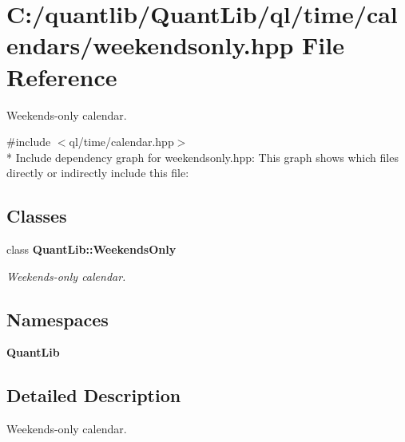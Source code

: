 \section{C\+:/quantlib/\+Quant\+Lib/ql/time/calendars/weekendsonly.hpp File Reference}
\label{weekendsonly_8hpp}


Weekends-\/only calendar.  


{\ttfamily \#include $<$ql/time/calendar.\+hpp$>$}\\*
Include dependency graph for weekendsonly.\+hpp\+:
This graph shows which files directly or indirectly include this file\+:
\subsection*{Classes}
\begin{DoxyCompactItemize}
\item 
class {\bf Quant\+Lib\+::\+Weekends\+Only}
\begin{DoxyCompactList}\small\item\em Weekends-\/only calendar. \end{DoxyCompactList}\end{DoxyCompactItemize}
\subsection*{Namespaces}
\begin{DoxyCompactItemize}
\item 
 {\bf Quant\+Lib}
\end{DoxyCompactItemize}


\subsection{Detailed Description}
Weekends-\/only calendar. 

